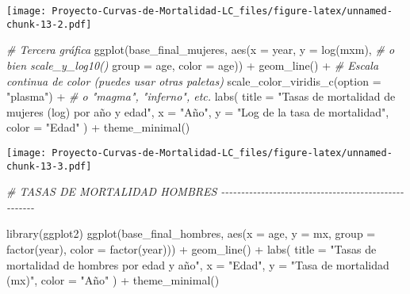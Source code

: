 \documentclass[
]{article}
\newenvironment{Shaded}{\begin{snugshade}}{\end{snugshade}}
\newcommand{\AttributeTok}[1]{\textcolor[rgb]{0.77,0.63,0.00}{#1}}
\newcommand{\CommentTok}[1]{\textcolor[rgb]{0.56,0.35,0.01}{\textit{#1}}}
\newcommand{\FunctionTok}[1]{\textcolor[rgb]{0.00,0.00,0.00}{#1}}
\newcommand{\NormalTok}[1]{#1}
\newcommand{\SpecialCharTok}[1]{\textcolor[rgb]{0.00,0.00,0.00}{#1}}
\newcommand{\StringTok}[1]{\textcolor[rgb]{0.31,0.60,0.02}{#1}}
\begin{document}
\texttt{[image: Proyecto-Curvas-de-Mortalidad-LC\_files/figure-latex/unnamed-chunk-13-2.pdf]}

\begin{Shaded}
\begin{Highlighting}[]
\CommentTok{\# Tercera gráfica}
\FunctionTok{ggplot}\NormalTok{(base\_final\_mujeres, }\FunctionTok{aes}\NormalTok{(}\AttributeTok{x =}\NormalTok{ year, }
                               \AttributeTok{y =} \FunctionTok{log}\NormalTok{(mxm),       }\CommentTok{\# o bien scale\_y\_log10()}
                               \AttributeTok{group =}\NormalTok{ age, }
                               \AttributeTok{color =}\NormalTok{ age)) }\SpecialCharTok{+}
  \FunctionTok{geom\_line}\NormalTok{() }\SpecialCharTok{+}
  \CommentTok{\# Escala continua de color (puedes usar otras paletas)}
  \FunctionTok{scale\_color\_viridis\_c}\NormalTok{(}\AttributeTok{option =} \StringTok{"plasma"}\NormalTok{) }\SpecialCharTok{+}  \CommentTok{\# o "magma", "inferno", etc.}
  \FunctionTok{labs}\NormalTok{(}
    \AttributeTok{title =} \StringTok{"Tasas de mortalidad de mujeres (log) por año y edad"}\NormalTok{,}
    \AttributeTok{x =} \StringTok{"Año"}\NormalTok{,}
    \AttributeTok{y =} \StringTok{"Log de la tasa de mortalidad"}\NormalTok{,}
    \AttributeTok{color =} \StringTok{"Edad"}
\NormalTok{  ) }\SpecialCharTok{+}
  \FunctionTok{theme\_minimal}\NormalTok{()}
\end{Highlighting}
\end{Shaded}

\texttt{[image: Proyecto-Curvas-de-Mortalidad-LC\_files/figure-latex/unnamed-chunk-13-3.pdf]}

\begin{Shaded}
\begin{Highlighting}[]
\CommentTok{\# TASAS DE MORTALIDAD HOMBRES {-}{-}{-}{-}{-}{-}{-}{-}{-}{-}{-}{-}{-}{-}{-}{-}{-}{-}{-}{-}{-}{-}{-}{-}{-}{-}{-}{-}{-}{-}{-}{-}{-}{-}{-}{-}{-}{-}{-}{-}{-}{-}{-}{-}{-}{-}{-}{-}{-}{-}{-}{-}{-}}

\FunctionTok{library}\NormalTok{(ggplot2)}
\FunctionTok{ggplot}\NormalTok{(base\_final\_hombres, }\FunctionTok{aes}\NormalTok{(}\AttributeTok{x =}\NormalTok{ age, }\AttributeTok{y =}\NormalTok{ mx, }\AttributeTok{group =} \FunctionTok{factor}\NormalTok{(year), }\AttributeTok{color =} \FunctionTok{factor}\NormalTok{(year))) }\SpecialCharTok{+}
  \FunctionTok{geom\_line}\NormalTok{() }\SpecialCharTok{+}
  \FunctionTok{labs}\NormalTok{(}
    \AttributeTok{title =} \StringTok{"Tasas de mortalidad de hombres por edad y año"}\NormalTok{,}
    \AttributeTok{x =} \StringTok{"Edad"}\NormalTok{,}
    \AttributeTok{y =} \StringTok{"Tasa de mortalidad (mx)"}\NormalTok{,}
    \AttributeTok{color =} \StringTok{"Año"}
\NormalTok{  ) }\SpecialCharTok{+}
  \FunctionTok{theme\_minimal}\NormalTok{()}
\end{Highlighting}
\end{Shaded}
\end{document}
